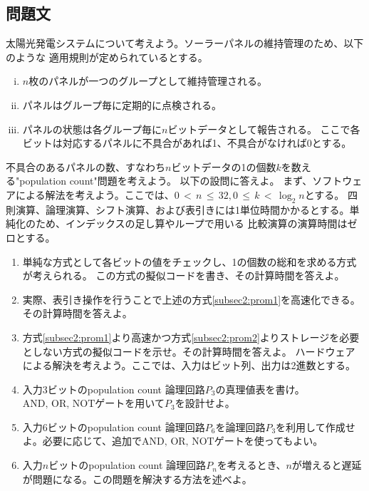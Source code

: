 \documentclass[dvipdfmx,titlepage, 11pt, a4paper]{jsarticle}%
\begin{document}
\subsection{問題文}
太陽光発電システムについて考えよう。ソーラーパネルの維持管理のため、以下のような
適用規則が定められているとする。
\begin{enumerate}[(i)]
    \item $n$枚のパネルが一つのグループとして維持管理される。
    \item パネルはグループ毎に定期的に点検される。
    \item パネルの状態は各グループ毎に$n$ビットデータとして報告される。
    ここで各ビットは対応するパネルに不具合があれば1、不具合がなければ0とする。
\end{enumerate}
不具合のあるパネルの数、すなわち$n$ビットデータの1の個数$k$を数える"population count"問題を考えよう。
以下の設問に答えよ。
\newline
\newline
まず、ソフトウェアによる解法を考えよう。ここでは、$0\, <\, n\, \leq\, 32, 0\, \leq\, k\, <\, \log_{2}n$とする。
四則演算、論理演算、シフト演算、および表引きには1単位時間かかるとする。単純化のため、インデックスの足し算やループで用いる
比較演算の演算時間はゼロとする。
\begin{enumerate}[(1)]
    \item 単純な方式として各ビットの値をチェックし、1の個数の総和を求める方式が考えられる。
    この方式の擬似コードを書き、その計算時間を答えよ。\label{subsec2:prom1}
    \item 実際、表引き操作を行うことで上述の方式\eqref{subsec2:prom1}を高速化できる。その計算時間を答えよ。\label{subsec2:prom2}
    \item 方式\eqref{subsec2:prom1}より高速かつ方式\eqref{subsec2:prom2}よりストレージを必要としない方式の擬似コードを示せ。その計算時間を答えよ。\label{subsec2:prom3}
    \newline
    \newline
    ハードウェアによる解決を考えよう。ここでは、入力はビット列、出力は2進数とする。
    \item 入力3ビットのpopulation count 論理回路$P_3$の真理値表を書け。$\mathrm{AND,\, OR,\, NOT}$ゲートを用いて$P_3$を設計せよ。\label{subsec2:prom4}
    \item 入力6ビットのpopulation count 論理回路$P_6$を論理回路$P_3$を利用して作成せよ。必要に応じて、追加で$\mathrm{AND,\, OR,\, NOT}$ゲートを使ってもよい。\label{subsec2:prom5}
    \item 入力$n$ビットのpopulation count 論理回路$P_n$を考えるとき、$n$が増えると遅延が問題になる。この問題を解決する方法を述べよ。\label{subsec2:prom6}
\end{enumerate}
\end{document}

